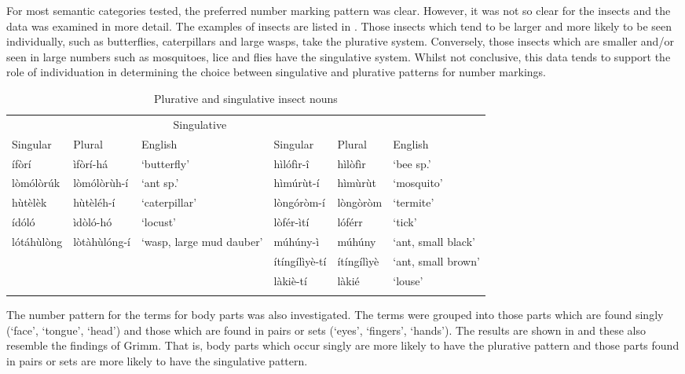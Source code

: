 \documentclass[output=paper]{langsci/langscibook}
\begin{document}
For most semantic categories tested, the preferred number marking pattern was clear. However, it was not so clear for the insects and the data was examined in more detail. The examples of insects are listed in . Those insects which tend to be larger and more likely to be seen individually, such as butterflies, caterpillars and large wasps, take the plurative system. Conversely, those insects which are smaller and/or seen in large numbers such as mosquitoes, lice and flies have the singulative system. Whilst not conclusive, this data tends to support the role of individuation in determining the choice between singulative and plurative patterns for number markings.

\begin{table}
\begin{tabularx}{\textwidth}{llXllX}
\lsptoprule

\multicolumn{3}{c}{{Plurative}} & \multicolumn{3}{c}{{Singulative}}\\ \cmidrule(lr){1-3}\cmidrule(lr){4-6}
  {Singular} &  {Plural} &  {English} &  {Singular} &  {Plural} &  {English}\\
\midrule
 ífòrí &  ìfòrí-há & ‘butterfly’ &  hìlófìr-î &  hìlòfìr & ‘bee sp.’\\
\tablevspace
 lòmólòrúk &  lòmólòrùh-í & ‘ant sp.’ &  hìmúrùt-í &  hìmùrùt & ‘mosquito’\\
\tablevspace
 hùtèlèk &  hùtèléh-í & ‘caterpillar’ &  lòngóròm-í &  lòngòròm & ‘termite’\\
\tablevspace
 ídóló &  ìdòló-hó & ‘locust’ &  lòfér-ìtí &  lóférr & ‘tick’\\
\tablevspace
 lótáhùlòng &  lòtàhùlóng-í & ‘wasp, large mud dauber’ &  múhúny-ì &  múhúny & ‘ant, small black’\\
\tablevspace
&  &  &  ítíngílìyè-tí &  ítíngílìyè & ‘ant, small brown’\\
\tablevspace
&  &  &  làkiè-tí &  làkié & ‘louse’\\
\lspbottomrule
\end{tabularx}
\caption{Plurative and singulative insect nouns}
\label{tab:moodie:7}
\end{table}

The number pattern for the terms for body parts was also investigated. The terms were grouped into those parts which are found singly (‘face’, ‘tongue’, ‘head’) and those which are found in pairs or sets (‘eyes’, ‘fingers’, ‘hands’). The results are shown in  and these also resemble the findings of Grimm.  That is, body parts which occur singly are more likely to have the plurative pattern and those parts found in pairs or sets are more likely to have the singulative pattern. 
\end{document}
